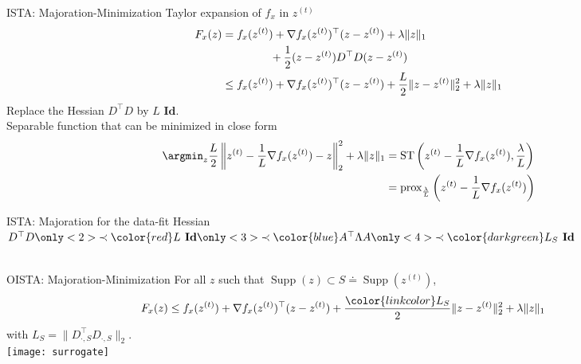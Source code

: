 \documentclass{beamer}
\DeclareMathOperator*{\supp}{Supp}
\begin{document}
\begin{frame}[t]{ISTA: Majoration-Minimization}
    Taylor expansion of $f_x$ in $z^{(t)}$
    \begin{align*}
        F_x(z) &  = f_x(z^{(t)}) + \nabla f_x(z^{(t)})^\top(z - z^{(t)}) + \lambda\|z\|_1\\
               & \hskip10ex + \frac{1}{2}(z - z^{(t)})D^\top D(z - z^{(t)})\\
               & \le f_x(z^{(t)}) + \nabla f_x(z^{(t)})^\top(z - z^{(t)}) + \frac{L}{2}\|z - z^{(t)}\|_2^2 + \lambda\|z\|_1
    \end{align*}
    Replace the Hessian $D^\top D$ by $L \textbf{ Id}$.\\[2em]
    
    Separable function that can be minimized in close form
    \begin{align*}
        \argmin_z \frac{L}{2}\left\|z^{(t)} - \frac{1}{L}\nabla f_x(z^{(t)}) - z\right\|_2^2 + \lambda\|z\|_1
        & = \text{ST}\left(z^{(t)} - \frac{1}{L}\nabla f_x(z^{(t)}),
                           \frac{\lambda}{L}\right)\\
        & = \text{prox}_{\frac{\lambda}{L}}\left(z^{(t)} - \frac{1}{L}\nabla f_x(z^{(t)})\right)
    \end{align*}
\end{frame}

\begin{frame}{ISTA: Majoration for the data-fit}
    \myitem{} Hessian $D^\top D
                       \only<2>{\prec \color{red} L \textbf{ Id}}
                       \only<3>{\prec \color{blue} A^\top \Lambda A}
                       \only<4>{\prec \color{darkgreen} L_S \textbf{ Id}}$
              \\
    \centering
    \\
\end{frame}


\begin{frame}[t]{OISTA: Majoration-Minimization}
    For all $z$ such that $\supp(z) \subset S \doteq \supp(z^{(t)})$,
    \begin{align*}
    F_x(z) & \le f_x(z^{(t)}) + \nabla f_x(z^{(t)})^\top(z - z^{(t)})
           + \frac{\color{linkcolor} L_S}{2}\|z - z^{(t)}\|_2^2 + \lambda\|z\|_1
    \end{align*}
    with $L_S = \|D_{\cdot,S}^\top D_{\cdot,S}\|_2$.\\[1em]
    
\centering
\texttt{[image: surrogate]}\\

\end{frame}
\end{document}

